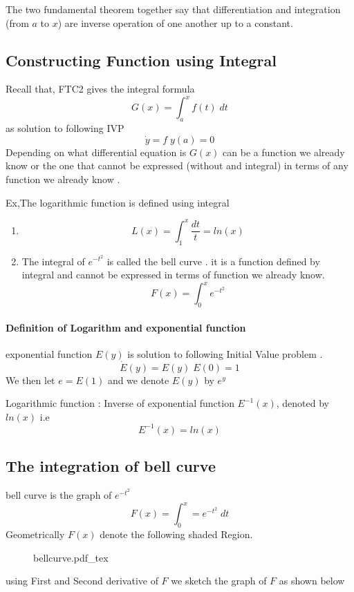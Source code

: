 The two fundamental theorem together say that differentiation and integration
(from $a$ to $x$)  are inverse operation of one another up 
to a constant. 

\subsection{Constructing Function using Integral}
Recall that, FTC2 gives the integral formula 
   \[
	G(x) = \int_{a}^{x} f(t) \; dt
   \]
   as solution to following IVP
      \[
   	\dot{y} = f \; y(a) = 0
      \]
Depending on what differential equation is $G(x)$ can be a function we 
already know or the one that cannot be expressed (without and integral) 
in terms of any function we already know . 

Ex,The logarithmic function is defined using integral 
\begin{enumerate}

    \item 
   \[
	L(x) = \int_{1}^{x} \frac{dt}{t} = ln(x)
   \]
   \item  The integral of $e^{-t^{2}}$ is called the bell curve . it is a function 
	defined by integral and cannot be expressed in  terms of function we 
	already know. 
	   \[
		F(x) = \int_{0}^{x} e^{-t^{2}} 
	   \]
\end{enumerate}
\paragraph{Definition of Logarithm and exponential  function}
exponential function $E(y)$ is solution to following Initial Value problem .
   \[
	\dot{E}(y) = E(y) \; E(0) = 1
   \]
   We then let $e = E(1)$ and we denote $E(y)$ by $e^{y}$

   Logarithmic function : Inverse of exponential function $E^{-1}(x)$, denoted by $ln(x)$
   i.e 
      \[
   	E^{-1}(x) = ln(x)
      \]
\subsection{The integration of bell curve }

bell curve is the graph of $e^{-t^{2}}$ 
   \[
	F(x)  = \int_{0}^{x} =  e^{-t^{2}} \; dt
   \]
   Geometrically $F(x)$ denote the following shaded Region. 
\begin{figure}[H]
	\centering
	\def\svgwidth{0.5\columnwidth}
	{bellcurve.pdf_tex}
\end{figure}

using First and Second derivative of $F$ we sketch the graph of $F$ as 
shown below 

